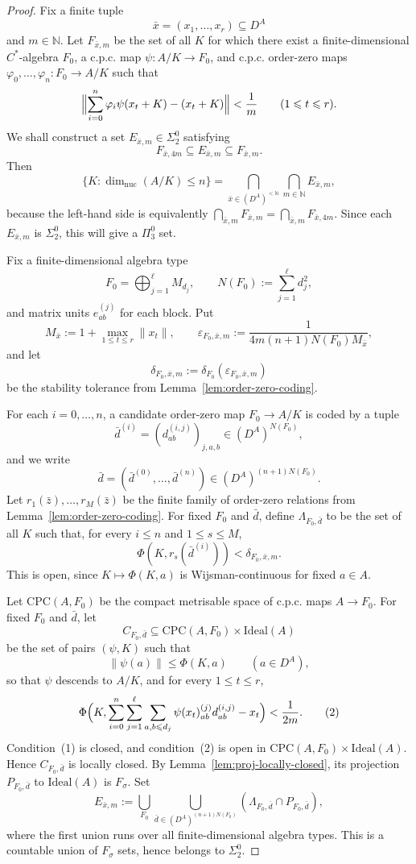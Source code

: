 \documentclass[10pt,a4paper]{amsart}
\newcommand{\Ideal}{\mathrm{Ideal}}
\newcommand{\N}{\mathbb{N}}
\renewcommand{\le}{\leqslant}
\begin{document}
\begin{proof}
Fix a finite tuple
\[
\bar x=(x_1,\dots,x_r)\subseteq D^A
\]
and $m\in\N$.  Let $F_{\bar x,m}$ be the set of all $K$ for which there exist a
finite-dimensional $C^*$-algebra $F_0$, a c.p.c. map
$\psi:A/K\to F_0$, and c.p.c. order-zero maps
$\varphi_0,\dots,\varphi_n:F_0\to A/K$ such that
\[
\Bigl\|\sum_{i=0}^{n}\varphi_i\psi(x_t+K)-(x_t+K)\Bigr\|<\frac1m
\qquad (1\le t\le r).
\]
We shall construct a set $E_{\bar x,m}\in\Sigma^0_2$ satisfying
\[
        F_{\bar x,4m}\subseteq E_{\bar x,m}\subseteq F_{\bar x,m}.        \tag{*}
\]
Then
\[
\{K:\dim_{\mathrm{nuc}}(A/K)\le n\}
=
\bigcap_{\bar x\in(D^A)^{<\N}}\bigcap_{m\in\N} E_{\bar x,m},
\]
because the left-hand side is equivalently
$\bigcap_{\bar x,m}F_{\bar x,m}=\bigcap_{\bar x,m}F_{\bar x,4m}$.  Since each
$E_{\bar x,m}$ is $\Sigma^0_2$, this will give a $\Pi^0_3$ set.

Fix a finite-dimensional algebra type
\[
F_0=\bigoplus_{j=1}^{\ell}M_{d_j},
\qquad
N(F_0):=\sum_{j=1}^{\ell}d_j^2,
\]
and matrix units $e_{ab}^{(j)}$ for each block.  Put
\[
M_{\bar x}:=1+\max_{1\le t\le r}\|x_t\|,
\qquad
\varepsilon_{F_0,\bar x,m}:=
\frac{1}{4m(n+1)N(F_0)M_{\bar x}},
\]
and let
\[
\delta_{F_0,\bar x,m}:=\delta_{F_0}(\varepsilon_{F_0,\bar x,m})
\]
be the stability tolerance from Lemma~\ref{lem:order-zero-coding}.

For each $i=0,\dots,n$, a candidate order-zero map $F_0\to A/K$ is coded by a tuple
\[
\bar d^{(i)}=(d_{ab}^{(i,j)})_{j,a,b}\in(D^A)^{N(F_0)},
\]
and we write
\[
\bar d=(\bar d^{(0)},\dots,\bar d^{(n)})\in(D^A)^{(n+1)N(F_0)}.
\]
Let $r_1(\bar z),\dots,r_M(\bar z)$ be the finite family of order-zero relations from
Lemma~\ref{lem:order-zero-coding}.  For fixed $F_0$ and $\bar d$, define
$\Lambda_{F_0,\bar d}$ to be the set of all $K$ such that, for every $i\le n$ and
$1\le s\le M$,
\[
        \Phi(K,r_s(\bar d^{(i)}))<\delta_{F_0,\bar x,m}.
\]
This is open, since $K\mapsto\Phi(K,a)$ is Wijsman-continuous for fixed $a\in A$.

Let $\mathrm{CPC}(A,F_0)$ be the compact metrisable space of c.p.c. maps
$A\to F_0$.  For fixed $F_0$ and $\bar d$, let
\[
C_{F_0,\bar d}\subseteq \mathrm{CPC}(A,F_0)\times\Ideal(A)
\]
be the set of pairs $(\psi,K)$ such that
\[
        \|\psi(a)\|\le \Phi(K,a)\qquad(a\in D^A),                    \tag{1}
\]
so that $\psi$ descends to $A/K$, and for every $1\le t\le r$,
\[
\Phi\Bigl(
K,
\sum_{i=0}^{n}\sum_{j=1}^{\ell}\sum_{a,b\le d_j}
\psi(x_t)^{(j)}_{ab}d_{ab}^{(i,j)}-x_t
\Bigr)
<\frac{1}{2m}.                                                        \tag{2}
\]
Condition~(1) is closed, and condition~(2) is open in
$\mathrm{CPC}(A,F_0)\times\Ideal(A)$.  Hence $C_{F_0,\bar d}$ is locally closed.
By Lemma~\ref{lem:proj-locally-closed}, its projection
$P_{F_0,\bar d}$ to $\Ideal(A)$ is $F_\sigma$.  Set
\[
        E_{\bar x,m}:=
        \bigcup_{F_0}\bigcup_{\bar d\in(D^A)^{(n+1)N(F_0)}}
        (\Lambda_{F_0,\bar d}\cap P_{F_0,\bar d}),
\]
where the first union runs over all finite-dimensional algebra types.  This is a
countable union of $F_\sigma$ sets, hence belongs to $\Sigma^0_2$.


\end{proof}
\end{document}
